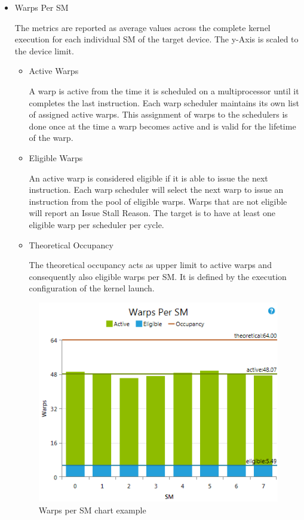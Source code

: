 \documentclass[oneside,openright,12pt,final,en]{mgr}
\begin{document}
\begin{itemize}
	\item Warps Per SM
	
	The metrics are reported as average values across the complete kernel execution for each individual SM of the target device. The y-Axis is scaled to the device limit.
	
	
	\begin{itemize}
		\item Active Warps  
		
		A warp is active from the time it is scheduled on a multiprocessor until it completes the last instruction. Each warp scheduler maintains its own list of assigned active warps. This assignment of warps to the schedulers is done once at the time a warp becomes active and is valid for the lifetime of the warp. 
		
		\item Eligible Warps 
		
		An active warp is considered eligible if it is able to issue the next instruction. Each warp scheduler will select the next warp to issue an instruction from the pool of eligible warps. Warps that are not eligible will report an Issue Stall Reason. The target is to have at least one eligible warp per scheduler per cycle.
		
		\item Theoretical Occupancy
		
		The theoretical occupancy acts as upper limit to active warps and consequently also eligible warps per SM. It is defined by the execution configuration of the kernel launch.
		
	\end{itemize}
	
	\begin{figure}[H]
		\centering
		\includegraphics{IssueEfficiencyChartWarpsPerSm}
		\caption{Warps per SM chart example}
	\end{figure}


\end{itemize}
\end{document}
